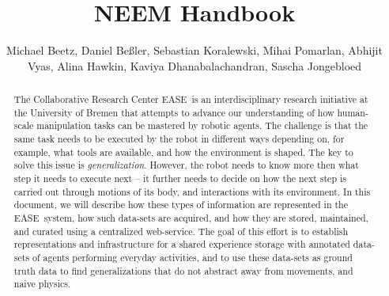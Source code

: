 \documentclass{svmult}
\title*{NEEM Handbook}
\author{
   Michael Beetz,
   Daniel Be{\ss}ler,
   Sebastian Koralewski,
   Mihai Pomarlan,
   Abhijit Vyas,
   Alina Hawkin,
   Kaviya Dhanabalachandran,
   Sascha Jongebloed
}
\institute{CRC Everyday Activity Science and Engineering (EASE)\\ University Bremen, Am Fallturm 1, 28359 Bremen\\ \texttt{ai-office@cs.uni-bremen.de}}
\newcommand{\ease}{EASE~}
\begin{document}
\let\oldaddcontentsline\addcontentsline
\def\addcontentsline#1#2#3{}
\maketitle
\def\addcontentsline#1#2#3{\oldaddcontentsline{#1}{#2}{#3}}

\begin{abstract}
The Collaborative Research Center \ease is an interdisciplinary research initiative at the University of Bremen that attempts to advance our understanding of how human-scale manipulation tasks can be mastered by robotic agents.
The challenge is that the same task needs to be executed by the robot in different ways depending on, for example, what tools are available, and how the environment is shaped.
The key to solve this issue is \emph{generalization}.
However, the robot needs to know more then what step it needs to execute next -- it further needs to decide on how the next step is carried out through motions of its body, and interactions with its environment.
In this document, we will describe how these types of information are represented in the \ease system, how such data-sets are acquired, and how they are stored, maintained, and curated using a centralized web-service.
The goal of this effort is to establish representations and infrastructure for a shared experience storage with annotated data-sets of agents performing everyday activities,
and to use these data-sets as ground truth data to find generalizations that do not abstract away from movements, and naive physics.
\end{abstract}

\cleardoublepage
\tableofcontents

\setcounter{page}{0}
\cleardoublepage

%
%

\setcounter{section}{0}


\setcounter{section}{0}


\setcounter{section}{0}


\setcounter{section}{0}


\setcounter{section}{0}


%
%

\cleardoublepage



%
\end{document}
